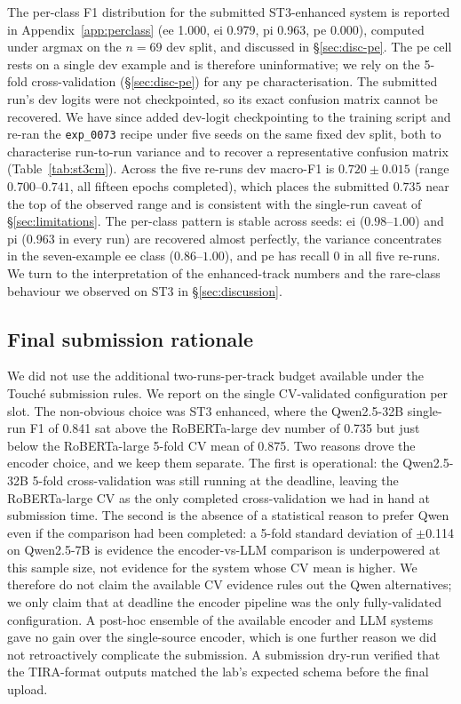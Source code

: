 The per-class F1 distribution for the submitted ST3-enhanced system is reported in Appendix~\ref{app:perclass} (\textsf{ee} 1.000, \textsf{ei} 0.979, \textsf{pi} 0.963, \textsf{pe} 0.000), computed under argmax on the $n=69$ dev split, and discussed in \S\ref{sec:disc-pe}. The \textsf{pe} cell rests on a single dev example and is therefore uninformative; we rely on the 5-fold cross-validation (\S\ref{sec:disc-pe}) for any \textsf{pe} characterisation. The submitted run's dev logits were not checkpointed, so its exact confusion matrix cannot be recovered. We have since added dev-logit checkpointing to the training script and re-ran the \texttt{exp\_0073} recipe under five seeds on the same fixed dev split, both to characterise run-to-run variance and to recover a representative confusion matrix (Table~\ref{tab:st3cm}). Across the five re-runs dev macro-F1 is $0.720 \pm 0.015$ (range $0.700$--$0.741$, all fifteen epochs completed), which places the submitted $0.735$ near the top of the observed range and is consistent with the single-run caveat of \S\ref{sec:limitations}. The per-class pattern is stable across seeds: \textsf{ei} ($0.98$--$1.00$) and \textsf{pi} ($0.963$ in every run) are recovered almost perfectly, the variance concentrates in the seven-example \textsf{ee} class ($0.86$--$1.00$), and \textsf{pe} has recall $0$ in all five re-runs. %
We turn to the interpretation of the enhanced-track numbers and the rare-class behaviour we observed on ST3 in \S\ref{sec:discussion}.

\subsection{Final submission rationale}
\label{sec:final-submission}

We did not use the additional two-runs-per-track budget available under the Touch\'{e} submission rules. We report on the single CV-validated configuration per slot. The non-obvious choice was ST3 enhanced, where the Qwen2.5-32B single-run F1 of 0.841 sat above the RoBERTa-large dev number of 0.735 but just below the RoBERTa-large 5-fold CV mean of 0.875. %
Two reasons drove the encoder choice, and we keep them separate. The first is operational: the Qwen2.5-32B 5-fold cross-validation was still running at the deadline, leaving the RoBERTa-large CV as the only completed cross-validation we had in hand at submission time. The second is the absence of a statistical reason to prefer Qwen even if the comparison had been completed: a 5-fold standard deviation of $\pm$0.114 on Qwen2.5-7B is evidence the encoder-vs-LLM comparison is underpowered at this sample size, not evidence for the system whose CV mean is higher. %
We therefore do not claim the available CV evidence rules out the Qwen alternatives; we only claim that at deadline the encoder pipeline was the only fully-validated configuration. A post-hoc ensemble of the available encoder and LLM systems gave no gain over the single-source encoder, which is one further reason we did not retroactively complicate the submission. %
A submission dry-run verified that the TIRA-format outputs matched the lab's expected schema before the final upload. %
